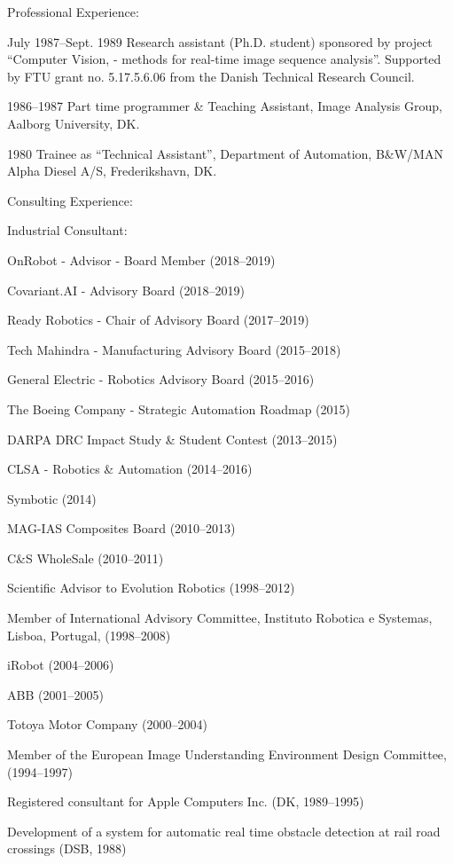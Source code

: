 \documentclass{article}
\newenvironment{sublist}{%
  \begin{list}{}{%
      \setlength{\itemsep}{0em}\setlength{\parsep}{0em}%
      \setlength{\topsep}{0em}\setlength{\parskip}{0em}%
    }%
}%
{ \end{list} }
\begin{document}
\begin{cv}
\begin{cvlist}{Professional Experience:}
\item[July 1987--Sept. 1989] Research assistant (Ph.D. student) sponsored
  by project ``Computer Vision, - methods for real-time image
  sequence analysis''. Supported by FTU grant no. 5.17.5.6.06 from the
  Danish Technical Research Council.

\item[1986--1987] Part time programmer \& Teaching Assistant,
  Image Analysis Group, Aalborg University, DK.

\item[1980] Trainee as ``Technical Assistant'', Department of
  Automation, B\&W/MAN Alpha Diesel A/S, Frederikshavn, DK.
\end{cvlist}

\begin{cvlist}{Consulting Experience:}
\item Industrial Consultant:
  \begin{sublist}
  \item OnRobot - Advisor - Board Member (2018--2019)
  \item Covariant.AI - Advisory Board (2018--2019)
  \item Ready Robotics - Chair of Advisory Board (2017--2019)
  \item Tech Mahindra - Manufacturing Advisory Board (2015--2018)
  \item General Electric - Robotics Advisory Board (2015--2016)
  \item The Boeing Company - Strategic Automation Roadmap (2015)
  \item DARPA DRC Impact Study \& Student Contest (2013--2015)
  \item CLSA - Robotics \& Automation (2014--2016)
  \item Symbotic (2014)
  \item MAG-IAS Composites Board (2010--2013)
  \item C\&S WholeSale (2010--2011)
  \item Scientific Advisor to Evolution Robotics (1998--2012)
  \item Member of International Advisory Committee, Instituto Robotica e
    Systemas, Lisboa, Portugal, (1998--2008)
  \item iRobot (2004--2006)
  \item ABB (2001--2005)
  \item Totoya Motor Company (2000--2004)
  \item Member of the European Image Understanding Environment Design
    Committee, (1994--1997)
  \item Registered consultant for Apple Computers Inc. (DK, 1989--1995)
  \item Development of a system for automatic real time obstacle
    detection at rail road crossings (DSB, 1988)
  \end{sublist}
\end{cvlist}


\end{cv}
\end{document}
